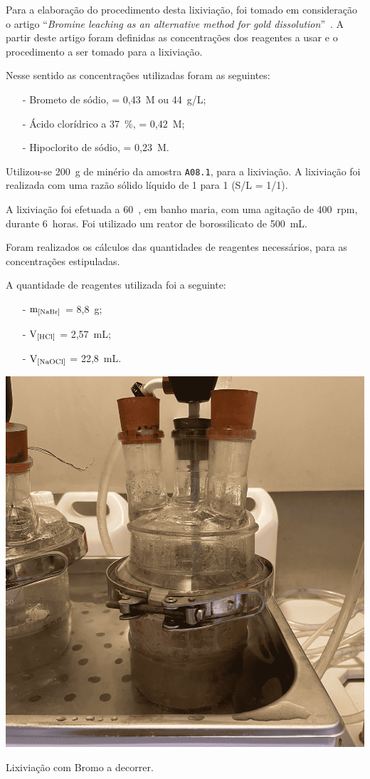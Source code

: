 Para a elaboração do procedimento desta lixiviação, foi tomado em consideração o artigo ``\emph{Bromine leaching as an alternative method for gold dissolution}''~\cite{bromo_2018}.
A partir deste artigo foram definidas as concentrações dos reagentes a usar e o procedimento a ser tomado para a lixiviação.

Nesse sentido as concentrações utilizadas foram as seguintes:
\begin{itemize}
    \item[-] Brometo de sódio, \bromo{} = 0,43~M ou 44~g/L;
    \item[-] Ácido clorídrico a 37~\%, \acl{} = 0,42~M;
    \item[-] Hipoclorito de sódio, \hipso{} = 0,23~M.  
\end{itemize}

Utilizou-se 200~g de minério da amostra \texttt{A08.1}, para a lixiviação.
A lixiviação foi realizada com uma razão sólido líquido de 1 para 1 (S/L = 1/1).

A lixiviação foi efetuada a 60~\graus{}, em banho maria, com uma agitação de 400~rpm, durante 6~horas.
Foi utilizado um reator de borossilicato de 500~mL.

Foram realizados os cálculos das quantidades de reagentes necessários, para as concentrações estipuladas. 

A quantidade de reagentes utilizada foi a seguinte:
\begin{itemize}
    \item[-] $\mathrm{m}_{\left[\bromo{}\right]}$ = 8,8~g;
    \item[-] $\mathrm{V}_{\left[\acl{}\right]}$ = 2,57~mL;
    \item[-] $\mathrm{V}_{\left[\hipso{}\right]}$ = 22,8~mL.
\end{itemize}

\begin{marginfigure}
    \centering
    \includegraphics[width=0.9\linewidth]{figures/lixiviação bromo}
    \caption{Lixiviação com Bromo a decorrer.}
    \label{fig:lixiacao-bromo}
\end{marginfigure}

